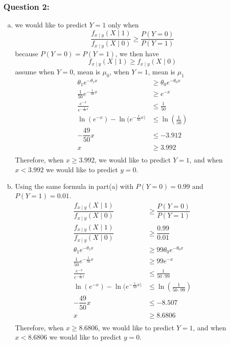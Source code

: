 \documentclass[12pt]{article}
\begin{document}
\subsubsection*{Question 2:} 
\begin{enumerate}[a)]
  \item 
  we would like to predict $Y=1$ only when
  \begin{equation*}
  \dfrac{f_{x \mid y}(X \mid 1)}{f_{x \mid y}(X \mid 0)} \geq \dfrac{P(Y=0)}{P(Y=1)}
  \end{equation*}
  because $P(Y=0)=P(Y=1)$, we then have
  \begin{equation*}
  f_{x \mid y}(X \mid 1) \geq f_{x \mid y}(X \mid 0)
  \end{equation*}
  assume when $Y=0$, mean is $\mu_{0}$, when $Y=1$, mean is $\mu_{1}$
  \begin{align*}
  \theta_{1}e^{-\theta_{1}x} &\geq \theta_{0}e^{-\theta_{0}x}\\
  \frac{1}{50}e^{-\frac{1}{50}x} &\geq e^{-x}\\
  \frac{e^{-x}}{e^{-\frac{1}{50}x}} &\leq \frac{1}{50}\\
  \ln{(e^{-x})}-\ln{(e^{-\frac{1}{50}x)}} &\leq \ln{\left(\frac{1}{50}\right)}\\
  -\dfrac{49}{50}x &\leq -3.912\\
  x &\geq 3.992\\
  \end{align*}
  Therefore, when $x \geq 3.992$, we would like to predict $Y=1$, and when $x<3.992$ we would like to predict $y=0$.
  
  \item 
  Using the same formula in part(a) with $P(Y=0)=0.99$ and $P(Y=1)=0.01$.
  \begin{align*}
  \dfrac{f_{x \mid y}(X \mid 1)}{f_{x \mid y}(X \mid 0)} &\geq \dfrac{P(Y=0)}{P(Y=1)}\\
  \dfrac{f_{x \mid y}(X \mid 1)}{f_{x \mid y}(X \mid 0)} &\geq \dfrac{0.99}{0.01}\\
  \theta_{1}e^{-\theta_{1}x} &\geq 99\theta_{0}e^{-\theta_{0}x}\\
  \frac{1}{50}e^{-\frac{1}{50}x} &\geq 99e^{-x}\\
  \frac{e^{-x}}{e^{-\frac{1}{50}x}} &\leq \frac{1}{50 \cdot 99}\\
  \ln{(e^{-x})}-\ln{(e^{-\frac{1}{50}x)}} &\leq \ln{\left(\frac{1}{50 \cdot 99}\right)}\\
  -\dfrac{49}{50}x &\leq -8.507\\
  x &\geq 8.6806\\
  \end{align*}
  Therefore, when $x \geq 8.6806$, we would like to predict $Y=1$, and when $x<8.6806$ we would like to predict $y=0$.
  

\end{enumerate}
\end{document}

